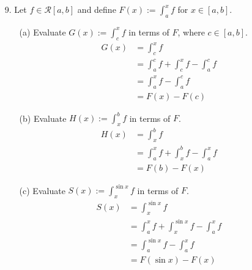 \documentclass[12pt,letterpaper]{article}
\theoremstyle{case}
\theoremstyle{definition}
\begin{document}
\begin{enumerate}
\begin{enumerate}
			\item[9.] Let $f \in \mathcal{R}[a,b]$ and define $F(x):=\displaystyle\int_{a}^{x}f$ for $x \in [a,b]$.
			\begin{enumerate}
				\item[(a)] Evaluate $G(x):=\displaystyle\int_{c}^{x}f$ in terms of $F$, where $c \in [a,b]$.
				\begin{align*}
					G(x)&=\int_{c}^{x} f \\
					&=\int_{a}^{c} f + \int_{c}^{x} f - \int_{a}^{c} f \\
					&= \int_{a}^{x} f-\int_{a}^{c} f \\
					&= F(x)-F(c)
				\end{align*}
				\item[(b)] Evaluate $H(x):=\displaystyle\int_{x}^{b} f$ in terms of $F$.
				\begin{align*}
					H(x)&=\int_{x}^{b} f \\
					&= \int_{a}^{x} f + \int_{x}^{b} f- \int_{a}^{x} f \\
					&= F(b)-F(x)
				\end{align*}
				\item[(c)] Evaluate $S(x):=\displaystyle\int_{x}^{\sin x} f$ in terms of $F$.
				\begin{align*}
					S(x)&= \int_{x}^{\sin x} f \\
					&= \int_{a}^{x} f + \int_{x}^{\sin x} f - \int_{a}^{x} f \\
					&= \int_{a}^{\sin x} f - \int_{a}^{x} f \\
					&= F(\sin x) - F(x)
				\end{align*}

\end{enumerate}
\end{enumerate}
\end{enumerate}
\end{document}
